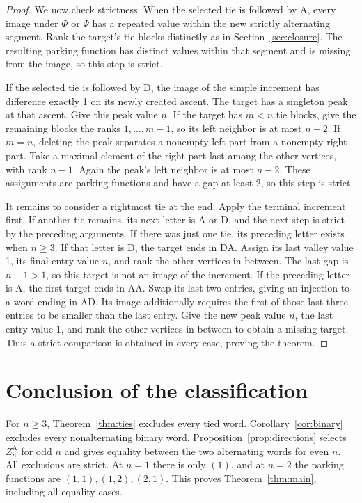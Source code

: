 \documentclass[11pt]{article}
\theoremstyle{definition}
\newcommand{\A}{\mathrm A}
\newcommand{\D}{\mathrm D}
\begin{document}
\begin{proof}
We now check strictness. When the selected tie is followed by $\A$,
every image under $\Phi$ or $\Psi$ has a repeated value within the
new strictly alternating segment. Rank the target's tie blocks
distinctly as in Section~\ref{sec:closure}. The resulting parking
function has distinct values within that segment and is missing
from the image, so this step is strict.

If the selected tie is followed by $\D$, the image of the simple
increment has difference exactly 1 on its newly created ascent.
The target has a singleton peak at that ascent. Give this peak
value $n$. If the target has $m<n$ tie blocks, give the remaining
blocks the ranks $1,\ldots,m-1$, so its left neighbor is at most $n-2$.
If $m=n$, deleting the peak separates a nonempty left part from
a nonempty right part. Take a maximal element of the right part
last among the other vertices, with rank $n-1$. Again the peak's
left neighbor is at most $n-2$. These assignments are parking
functions and have a gap at least 2, so this step is strict.

It remains to consider a rightmost tie at the end. Apply the terminal
increment first. If another tie remains, its next letter is $\A$
or $\D$, and the next step is strict by the preceding arguments.
If there was just one tie, its preceding letter exists when $n\ge3$.
If that letter is $\D$, the target ends in $\D\A$.
Assign its last valley value 1, its final entry value $n$, and rank
the other vertices in between. The last gap is $n-1>1$, so this
target is not an image of the increment.
If the preceding letter is $\A$, the first target ends in $\A\A$.
Swap its last two entries, giving an injection to a word ending in
$\A\D$. Its image additionally requires the first of those last
three entries to be smaller than the last entry. Give the new
peak value $n$, the last entry value 1, and rank the other vertices
in between to obtain a missing target. Thus a strict comparison
is obtained in every case, proving the theorem.
\end{proof}

\section{Conclusion of the classification}
For $n\ge3$, Theorem~\ref{thm:ties} excludes every tied word.
Corollary~\ref{cor:binary} excludes every nonalternating binary word.
Proposition~\ref{prop:directions} selects $Z_n^\A$ for odd $n$
and gives equality between the two alternating words for even $n$.
All exclusions are strict. At $n=1$ there is only $(1)$, and at
$n=2$ the parking functions are $(1,1),(1,2),(2,1)$.
This proves Theorem~\ref{thm:main}, including all equality cases.
\end{document}
